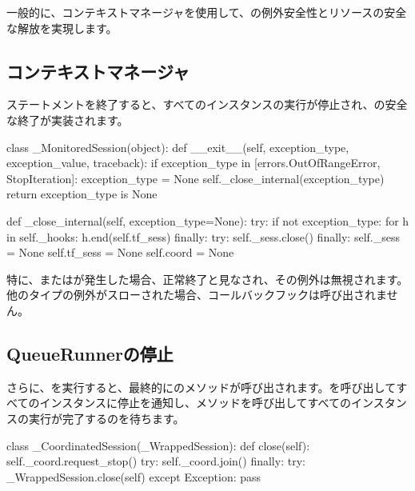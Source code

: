 \begin{content}

一般的に、コンテキストマネージャを使用して、の例外安全性とリソースの安全な解放を実現します。

\subsection{コンテキストマネージャ}

ステートメントを終了すると、すべてのインスタンスの実行が停止され、の安全な終了が実装されます。

\begin{leftbar}
\begin{python}
class _MonitoredSession(object):
  def __exit__(self, exception_type, exception_value, traceback):
    if exception_type in [errors.OutOfRangeError, StopIteration]:
      exception_type = None
    self._close_internal(exception_type)
    return exception_type is None
  
  def _close_internal(self, exception_type=None):
    try:
      if not exception_type:
        for h in self._hooks:
          h.end(self.tf_sess)
    finally:
      try:
        self._sess.close()
      finally:
        self._sess = None
        self.tf_sess = None
        self.coord = None  
\end{python}
\end{leftbar}

特に、またはが発生した場合、正常終了と見なされ、その例外は無視されます。他のタイプの例外がスローされた場合、コールバックフックは呼び出されません。

\subsection{QueueRunnerの停止}

さらに、を実行すると、最終的にのメソッドが呼び出されます。を呼び出してすべてのインスタンスに停止を通知し、メソッドを呼び出してすべてのインスタンスの実行が完了するのを待ちます。

\begin{leftbar}
\begin{python}
class _CoordinatedSession(_WrappedSession):
  def close(self):
    self._coord.request_stop()
    try:
      self._coord.join()
    finally:
      try:
        _WrappedSession.close(self)
      except Exception:
        pass
\end{python}
\end{leftbar}

\end{content}

